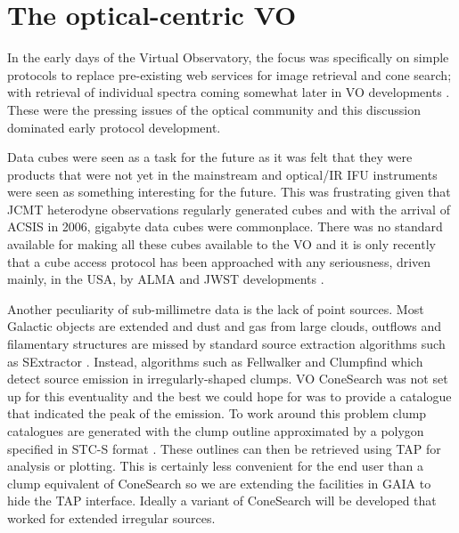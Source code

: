 \documentclass[final,authoryear,5p,times,twocolumn]{elsarticle}
\begin{document}
\section{The optical-centric VO}

In the early days of the Virtual Observatory, the focus was
specifically on simple protocols \citep{siap,cone} to replace pre-existing
web services for image retrieval and cone search; with retrieval of
individual spectra coming somewhat later in VO developments
\citep{ssap,splatvo}. These were the pressing issues of the optical
community and this discussion dominated early protocol development.

Data cubes were seen as a task for the future as it was
felt that they were products that were not yet in the mainstream and
optical/IR IFU instruments \citep[such as
UIST;][]{2004SPIE.5492.1160R} were seen as something interesting for
the future. This was frustrating given that JCMT heterodyne
observations regularly generated cubes and with the arrival of ACSIS
in 2006, gigabyte data cubes were commonplace. There was no standard
available for making all these cubes available to the VO and it is
only recently \citep[e.g.,][]{2014AAS...22325505T} that a cube access
protocol has been approached with any seriousness, driven mainly, in
the USA, by ALMA and JWST developments \citep[e.g.,
MIRI;][]{2010SPIE.7731E..10W}.

Another peculiarity of sub-millimetre data is the lack of point
sources. Most Galactic objects are extended and dust and gas from
large clouds, outflows and filamentary structures are missed by
standard source extraction algorithms such as SExtractor
\citep[][]{1996A&AS..117..393B}. Instead, algorithms
such as Fellwalker \citep[][]{2007ASPC..376..425B} and
Clumpfind \citep[][]{1994ApJ...428..693W} which detect
source emission in irregularly-shaped clumps. VO ConeSearch was not
set up for this eventuality and the best we could hope for was to
provide a catalogue that indicated the peak of the emission. To work
around this problem clump catalogues are generated with the clump
outline approximated by a polygon specified in STC-S format
\citep{2010ASPC..434..213B}. These outlines can then be retrieved
using TAP for analysis or plotting. This is certainly less convenient
for the end user than a clump equivalent of ConeSearch so we are
extending the facilities in GAIA
\citep[][]{2009ASPC..411..575D} to hide the TAP
interface. Ideally a variant of ConeSearch will be developed that
worked for extended irregular sources.
\end{document}
